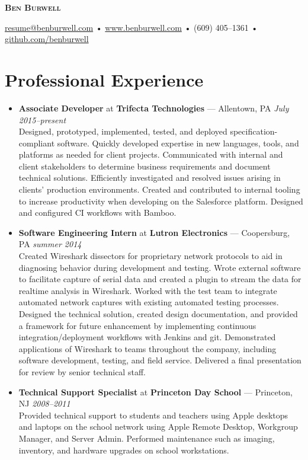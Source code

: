 \documentclass[11pt]{article}
\begin{document}
\thispagestyle{empty}

\begin{center}
  {\LARGE\textsc{\textbf{Ben Burwell}}}
\end{center}
\begin{center}
  \href{mailto:resume@benburwell.com}{resume@benburwell.com} • \href{https://www.benburwell.com/}{www.benburwell.com} • (609) 405--1361 • \href{https://github.com/benburwell}{github.com/benburwell} \\
  \hrulefill
\end{center}



\section*{Professional Experience}
\begin{itemize}
  \item \textbf{Associate Developer} at \textbf{Trifecta Technologies} --- Allentown, PA \hfill {\em July 2015--present} \\
    Designed, prototyped, implemented, tested, and deployed specification-compliant software.
    Quickly developed expertise in new languages, tools, and platforms as needed for client projects.
    Communicated with internal and client stakeholders to determine business requirements and document technical solutions.
    Efficiently investigated and resolved issues arising in clients' production environments.
    Created and contributed to internal tooling to increase productivity when developing on the Salesforce platform.
    Designed and configured CI workflows with Bamboo.

  \item \textbf{Software Engineering Intern} at \textbf{Lutron Electronics} --- Coopersburg, PA \hfill {\em summer 2014} \\
    Created Wireshark dissectors for proprietary network protocols to aid in diagnosing behavior during development and testing.
    Wrote external software to facilitate capture of serial data and created a plugin to stream the data for realtime analysis in Wireshark.
    Worked with the test team to integrate automated network captures with existing automated testing processes.
    Designed the technical solution, created design documentation, and provided a framework for future enhancement by implementing continuous integration/deployment workflows with Jenkins and git.
    Demonstrated applications of Wireshark to teams throughout the company, including software development, testing, and field service.
    Delivered a final presentation for review by senior technical staff.

  \item \textbf{Technical Support Specialist} at \textbf{Princeton Day School} --- Princeton, NJ \hfill {\em 2008--2011} \\
    Provided technical support to students and teachers using Apple desktops and laptops on the school network using Apple Remote Desktop, Workgroup Manager, and Server Admin.
    Performed maintenance such as imaging, inventory, and hardware upgrades on school workstations.
\end{itemize}
\end{document}
